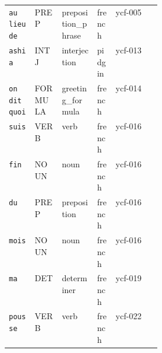 \begin{longtable}{@{}llll p{0.30\linewidth}@{}}
\texttt{au lieu de} & PREP & preposition\_phrase & french & \small ycf-005 \\
\texttt{ashia} & INTJ & interjection & pidgin & \small ycf-013 \\
\texttt{on dit quoi} & FORMULA & greeting\_formula & french & \small ycf-014 \\
\texttt{suis} & VERB & verb & french & \small ycf-016 \\
\texttt{fin} & NOUN & noun & french & \small ycf-016 \\
\texttt{du} & PREP & preposition & french & \small ycf-016 \\
\texttt{mois} & NOUN & noun & french & \small ycf-016 \\
\texttt{ma} & DET & determiner & french & \small ycf-019 \\
\texttt{pousse} & VERB & verb & french & \small ycf-022 \\
\end{longtable}
